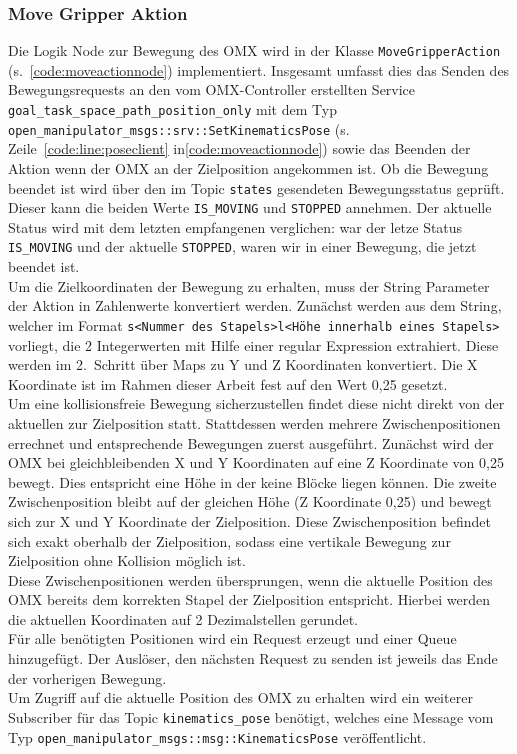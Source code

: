 \subsubsection{Move Gripper Aktion}
Die Logik Node zur Bewegung des OMX wird in der Klasse \verb|MoveGripperAction| (s.~\ref{code:moveactionnode}) implementiert.
Insgesamt umfasst dies das Senden des Bewegungsrequests an den vom OMX-Controller erstellten Service \verb|goal_task_space_path_position_only| mit dem Typ \verb|open_manipulator_msgs::srv::SetKinematicsPose| (s. Zeile~\ref{code:line:poseclient} in\ref{code:moveactionnode}) sowie das Beenden der Aktion wenn der OMX an der Zielposition angekommen ist.
Ob die Bewegung beendet ist wird über den im Topic \verb|states| gesendeten Bewegungsstatus geprüft.
Dieser kann die beiden Werte \verb|IS_MOVING| und \verb|STOPPED| annehmen.
Der aktuelle Status wird mit dem letzten empfangenen verglichen: war der letze Status \verb|IS_MOVING| und der aktuelle \verb|STOPPED|, waren wir in einer Bewegung, die jetzt beendet ist.\\
Um die Zielkoordinaten der Bewegung zu erhalten, muss der String Parameter der Aktion in Zahlenwerte konvertiert werden.
Zunächst werden aus dem String, welcher im Format \verb|s<Nummer des Stapels>l<Höhe innerhalb eines Stapels>| vorliegt, die 2 Integerwerten mit Hilfe einer regular Expression extrahiert.
Diese werden im 2.\ Schritt über Maps zu Y und Z Koordinaten konvertiert.
Die X Koordinate ist im Rahmen dieser Arbeit fest auf den Wert 0,25 gesetzt.\\
Um eine kollisionsfreie Bewegung sicherzustellen findet diese nicht direkt von der aktuellen zur Zielposition statt.
Stattdessen werden mehrere Zwischenpositionen errechnet und entsprechende Bewegungen zuerst ausgeführt.
Zunächst wird der OMX bei gleichbleibenden X und Y Koordinaten auf eine Z Koordinate von 0,25 bewegt.
Dies entspricht eine Höhe in der keine Blöcke liegen können.
Die zweite Zwischenposition bleibt auf der gleichen Höhe (Z Koordinate 0,25) und bewegt sich zur X und Y Koordinate der Zielposition.
Diese Zwischenposition befindet sich exakt oberhalb der Zielposition, sodass eine vertikale Bewegung zur Zielposition ohne Kollision möglich ist.\\
Diese Zwischenpositionen werden übersprungen, wenn die aktuelle Position des OMX bereits dem korrekten Stapel der Zielposition entspricht.
Hierbei werden die aktuellen Koordinaten auf 2 Dezimalstellen gerundet.\\
Für alle benötigten Positionen wird ein Request erzeugt und einer Queue hinzugefügt.
Der Auslöser, den nächsten Request zu senden ist jeweils das Ende der vorherigen Bewegung.\\
Um Zugriff auf die aktuelle Position des OMX zu erhalten wird ein weiterer Subscriber für das Topic \verb|kinematics_pose| benötigt, welches eine Message vom Typ \verb|open_manipulator_msgs::msg::KinematicsPose| veröffentlicht.




